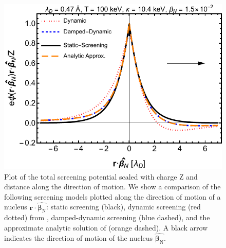 \begin{figure} 
 \centerline{
\includegraphics[width=.90\linewidth]{plots/chap03BBN/phidat_100_1_1_0_full_lin.pdf}}
 \caption{Plot of the total screening potential scaled with charge Z and distance along the direction of motion. We show a comparison of the following screening models plotted along the direction of motion of a nucleus $\boldsymbol{r}\cdot\hat{\boldsymbol{\beta}_{\text{N}}}$: static screening (black), dynamic screening (red dotted) from \cite{Hwang:2021kno}, damped-dynamic screening (blue dashed), and the approximate analytic solution of  (orange dashed). A black arrow indicates the direction of motion of the nucleus $\hat{\boldsymbol{\beta}_{\text{N}}}$. }
 \label{fig:dynamiclinear}
\end{figure} 


